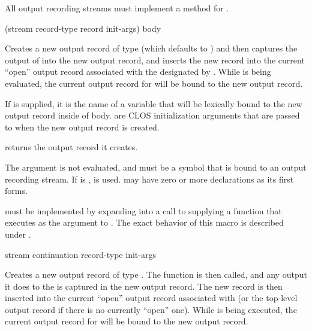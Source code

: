 All output recording streams must implement a method for
.


 {(stream \optional record-type record
                                     \rest init-args)
                                    \body body}

Creates a new output record of type  (which defaults to
) and then captures the output of 
into the new output record, and inserts the new record into the current ``open''
output record associated with the  designated by
.  While  is being evaluated, the current output record
for  will be bound to the new output record.

If  is supplied, it is the name of a variable that will be lexically
bound to the new output record inside of body.   are CLOS
initialization arguments that are passed to  when the new output
record is created.

 returns the output record it creates. 

The  argument is not evaluated, and must be a symbol that is bound to
an output recording stream.  If  is ,  is
used.   may have zero or more declarations as its first forms.

 must be implemented by expanding into a call to
 supplying a function that executes 
as the  argument to .  The exact
behavior of this macro is described under .

 {stream continuation record-type
                                             \rest init-args \key}

Creates a new output record of type .  The function
 is then called, and any output it does to the   is captured in the new output record.  The new
record is then inserted into the current ``open'' output record associated with
 (or the top-level output record if there is no currently ``open''
one).  While  is being executed, the current output record for
 will be bound to the new output record.

